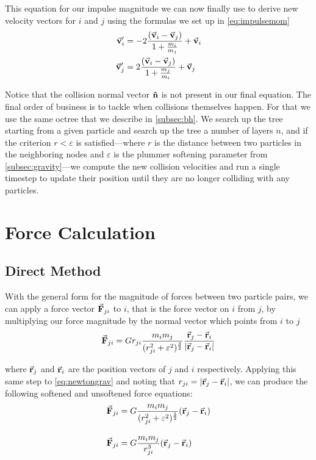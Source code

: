 \documentclass[12pt, twoside, letterpaper]{article}
\begin{document}
\noindent This equation for our impulse magnitude we can now finally use to derive new velocity vectors for $i$ and $j$ using the formulas we set up in \eqref{eq:impulsemom}
\begin{subequations} \label{eq:newvs}
	\begin{align}
		\va{v}_i^\prime & = -2 \dfrac{(\va{v}_i-\va{v}_j)}{1+\frac{m_i}{m_j}} + \va{v}_i \\
		\va{v}_j^\prime & =  2 \dfrac{(\va{v}_i-\va{v}_j)}{1+\frac{m_j}{m_i}} + \va{v}_j
	\end{align}
\end{subequations}

\noindent Notice that the collision normal vector $\vu{n}$ is not present in our final equation. The final order of business is to tackle when collisions themselves happen. For that we use the same octree that we describe in \ref{subsec:bh}. We search up the tree starting from a given particle and search up the tree a number of layers $n$, and if the criterion $r < \varepsilon$ is satisfied---where $r$ is the distance between two particles in the neighboring nodes and $\varepsilon$ is the plummer softening parameter from \ref{subsec:gravity}---we compute the new collision velocities and run a single timestep to update their position until they are no longer colliding with any particles.

\section{Force Calculation} \label{sec:force}
\subsection{Direct Method} \label{subsec:dm}
With the general form for the magnitude of forces between two particle pairs, we can apply a force vector $\va{F}_{ji}$ to $i$, that is the force vector on $i$ from $j$, by multiplying our force magnitude by the normal vector which points from $i$ to $j$
\begin{equation}
\va{F}_{ji} = G r_{ji} \dfrac{m_im_j}{(r_{ji}^2 + \varepsilon^2)^\frac{3}{2}} \dfrac{\va{r}_j - \va{r}_i}{|\va{r}_j - \va{r}_i|}
\end{equation}

\noindent where $\va{r}_j$ and $\va{r}_i$ are the position vectors of $j$ and $i$ respectively. Applying this same step to \eqref{eq:newtongrav} and noting that $r_{ji} = |\va{r}_j-\va{r}_i|$, we can produce the following softened and unsoftened force equations:
\begin{subequations} \label{eq:\theequation}
	\begin{align}
		& \va{F}_{ji} = G \dfrac{m_im_j}{(r_{ji}^2 + \varepsilon^2)^\frac{3}{2}} ({\va{r}_j - \va{r}_i}) \label{eq:fplum} \\[10pt]
		& \va{F}_{ji} = G \dfrac{m_im_j}{r_{ji}^3}(\va{r}_j-\va{r}_i) \label{eq:fnorm}
	\end{align}

\end{subequations}
\end{document}
